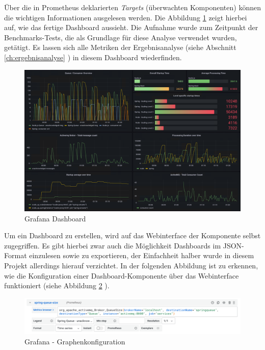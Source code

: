 Über die in Prometheus deklarierten \emph{Targets} (überwachten Komponenten) können die wichtigen Informationen ausgelesen werden. Die Abbildung \ref{fig:grafanaOverview}  zeigt hierbei auf, wie das fertige Dashboard aussieht. Die Aufnahme wurde zum Zeitpunkt der Benchmarks-Tests, die als Grundlage für diese Analyse verwendet wurden, getätigt. Es lassen sich alle Metriken der Ergebnisanalyse (siehe Abschnitt \ref{ch:ergebnisanalyse} ) in diesem Dashboard wiederfinden. 

\begin{figure}
	\centering
	\includegraphics[width=\linewidth]{kapitel/problemloesung/implementierung/_img/grafana-dashboard-01}
	\caption[]{Grafana Dashboard}
	\label{fig:grafanaOverview}
\end{figure}

Um ein Dashboard zu erstellen, wird auf das Webinterface der Komponente selbst zugegriffen. Es gibt hierbei zwar auch die Möglichkeit Dashboards im JSON-Format einzulesen sowie zu exportieren, der Einfachheit halber wurde in diesem Projekt allerdings hierauf verzichtet. In der folgenden Abbildung ist zu erkennen, wie die Konfiguration einer Dashboard-Komponente über das Webinterface funktioniert (siehe Abbildung \ref{fig:grafanaPromQl} ). 

\begin{figure}
	\centering
	\includegraphics[width=\linewidth]{kapitel/problemloesung/implementierung/_img/grafana-promql}
	\caption[]{Grafana - Graphenkonfiguration}
	\label{fig:grafanaPromQl}
\end{figure}

